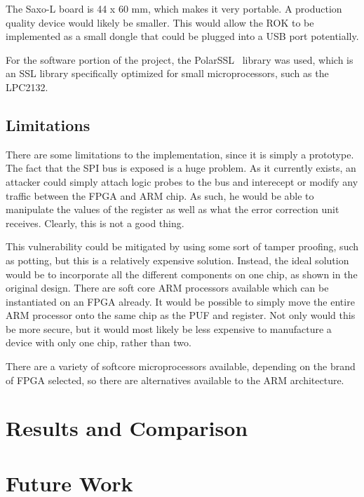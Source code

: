 The Saxo-L board is 44 x 60 mm, which makes it very portable. A production quality device would likely be smaller.
This would allow the ROK to be implemented as a small dongle that could be plugged into a USB port potentially.

For the software portion of the project, the PolarSSL~\cite{polarssl} library was used, which is an SSL library
specifically optimized for small microprocessors, such as the LPC2132.

\subsection{Limitations}
There are some limitations to the implementation, since it is simply a prototype. The fact that the SPI bus is exposed
is a huge problem. As it currently exists, an attacker could simply attach logic probes to the bus and interecept or
modify any traffic between the FPGA and ARM chip. As such, he would be able to manipulate the values of the register
as well as what the error correction unit receives. Clearly, this is not a good thing.

This vulnerability could be mitigated by using some sort of tamper proofing, such as potting, but this is a relatively
expensive solution. Instead, the ideal solution would be to incorporate all the different components on one chip, as
shown in the original design. There are soft core ARM processors available which can be instantiated on an FPGA
already. It would be possible to simply move the entire ARM processor onto the same chip as the PUF and register.
Not only would this be more secure, but it would most likely be less expensive to manufacture a device with only
one chip, rather than two.

There are a variety of softcore microprocessors available, depending on the brand of FPGA selected, so there are
alternatives available to the ARM architecture.

\section{Results and Comparison}

\section{Future Work}

